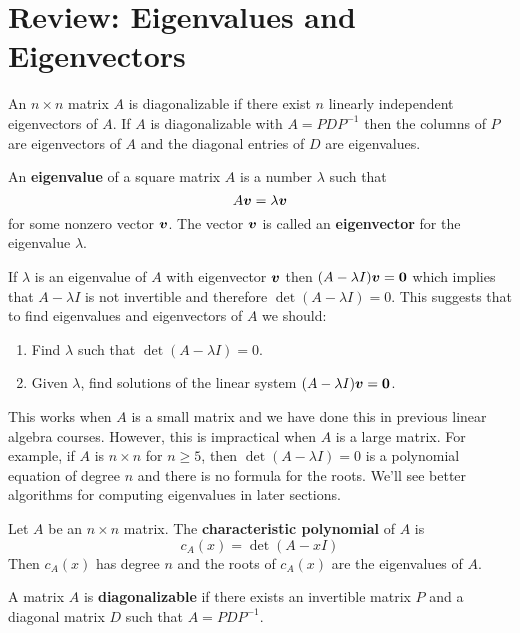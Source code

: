 \section{Review: Eigenvalues and Eigenvectors}

\begin{bigidea}
An $n \times n$ matrix $A$ is diagonalizable if there exist $n$ linearly independent eigenvectors of $A$. If $A$ is diagonalizable with $A = PDP^{-1}$ then the columns of $P$ are eigenvectors of $A$ and the diagonal entries of $D$ are eigenvalues.
\end{bigidea}

\begin{definition}
An {\bf eigenvalue} of a square matrix $A$ \cite[p.173]{KN} is a number $\lambda$ such that
$$
A \boldsymbol{v} = \lambda \boldsymbol{v}
$$
for some nonzero vector $\boldsymbol{v}$. The vector $\boldsymbol{v}$ is called an {\bf eigenvector} for the eigenvalue $\lambda$.
\end{definition}

\begin{note}
If $\lambda$ is an eigenvalue of $A$ with eigenvector $\boldsymbol{v}$ then $(A - \lambda I)\boldsymbol{v} = \boldsymbol{0}$ which implies that $A - \lambda I$ is not invertible and therefore $\det(A - \lambda I) = 0$. This suggests that to find eigenvalues and eigenvectors of $A$ we should:
\begin{enumerate}
\item Find $\lambda$ such that $\det(A - \lambda I) = 0$.
\item Given $\lambda$, find solutions of the linear system $(A - \lambda I)\boldsymbol{v} = \boldsymbol{0}$.
\end{enumerate}
This works when $A$ is a small matrix and we have done this in previous linear algebra courses. However, this is impractical when $A$ is a large matrix. For example, if $A$ is $n \times n$ for $n \geq 5$, then $\det(A - \lambda I) = 0$ is a polynomial equation of degree $n$ and there is no formula for the roots. We'll see better algorithms for computing eigenvalues in later sections.
\end{note}

\begin{definition}
Let $A$ be an $n \times n$ matrix. The {\bf characteristic polynomial} of $A$ \cite[p.173]{KN} is
$$
c_A(x) = \det(A - xI)
$$
Then $c_A(x)$ has degree $n$ and the roots of $c_A(x)$ are the eigenvalues of $A$.
\end{definition}

\begin{definition}
A matrix $A$ is {\bf diagonalizable} \cite[p.178]{KN} if there exists an invertible matrix $P$ and a diagonal matrix $D$ such that $A = PD P^{-1}$.
\end{definition}

